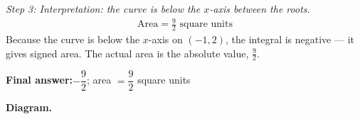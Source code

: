 \documentclass[11pt]{article}
\begin{document}
\textit{Step 3: Interpretation: the curve is below the \( x \)-axis between the roots.}
\[\begin{gathered}
\text{Area} = \frac{9}{2} \text{ square units}
\end{gathered}\]
Because the curve is below the \( x \)-axis on \((-1, 2)\), the integral is negative --- it gives signed area. The actual area is the absolute value, \( \tfrac{9}{2} \).

\begin{answerbox}
\textbf{Final answer:}\quad \(\displaystyle  -\dfrac{9}{2} \); area \(\displaystyle  = \dfrac{9}{2} \) square units
\end{answerbox}
\textbf{Diagram.}

\begin{center}
\end{center}
\end{document}
